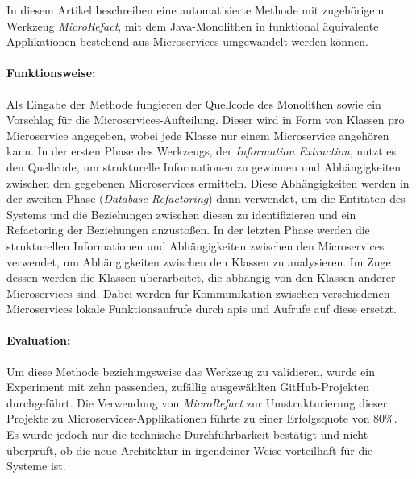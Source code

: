 In diesem Artikel beschreiben \citeauthor{arh-result-no-filter-4} eine automatisierte Methode mit zugehörigem Werkzeug \emph{MicroRefact}, mit dem Java-Monolithen in funktional äquivalente Applikationen bestehend aus Microservices umgewandelt werden können.
\paragraph{Funktionsweise:} Als Eingabe der Methode fungieren der Quellcode des Monolithen sowie ein Vorschlag für die Microservices-Aufteilung. Dieser wird in Form von Klassen pro Microservice angegeben, wobei jede Klasse nur einem Microservice angehören kann.
In der ersten Phase des Werkzeugs, der \emph{Information Extraction}, nutzt es den Quellcode, um strukturelle Informationen zu gewinnen und Abhängigkeiten zwischen den gegebenen Microservices ermitteln.
Diese Abhängigkeiten werden in der zweiten Phase (\emph{Database Refactoring}) dann verwendet, um die Entitäten des Systems und die Beziehungen zwischen diesen zu identifizieren und ein Refactoring der Beziehungen anzustoßen.
In der letzten Phase werden die strukturellen Informationen und Abhängigkeiten zwischen den Microservices verwendet, um Abhängigkeiten zwischen den Klassen zu analysieren.
Im Zuge dessen werden die Klassen überarbeitet, die abhängig von den Klassen anderer Microservices sind.
Dabei werden für Kommunikation zwischen verschiedenen Microservices lokale Funktionsaufrufe durch \glspl{api} und Aufrufe auf diese ersetzt.

\paragraph{Evaluation:} Um diese Methode beziehungsweise das Werkzeug zu validieren, wurde ein Experiment mit zehn passenden, zufällig ausgewählten GitHub-Projekten durchgeführt.
Die Verwendung von \emph{MicroRefact} zur Umstrukturierung dieser Projekte zu Microservices-Applikationen führte zu einer Erfolgsquote von 80\%.
Es wurde jedoch nur die technische Durchführbarkeit bestätigt und nicht überprüft, ob die neue Architektur in irgendeiner Weise vorteilhaft für die Systeme ist.

%

